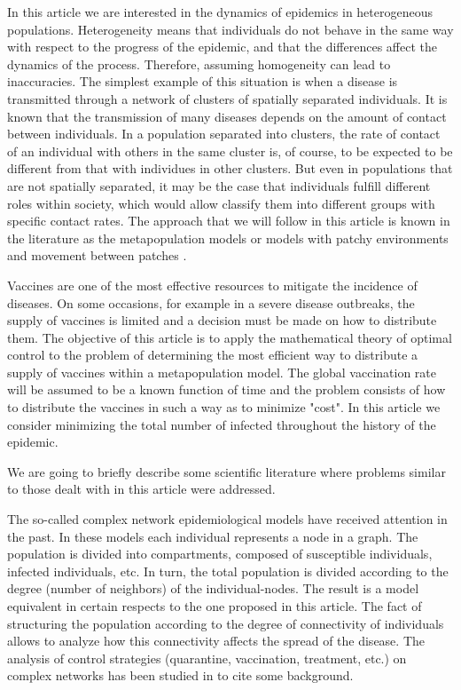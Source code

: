 \documentclass[a4paper,10pt]{article}
\theoremstyle{remark}
\begin{document}
In this article we are interested in the dynamics of epidemics in heterogeneous populations. Heterogeneity means that individuals do not behave in the same way with respect to the progress of the epidemic, and that the differences affect the dynamics of the process. Therefore, assuming  homogeneity can lead to inaccuracies. The simplest example of this situation is when a disease is transmitted through a network of clusters of spatially separated individuals. It is known that the transmission of many diseases depends on the amount of contact between individuals. In a population separated into clusters, the rate of contact of an individual with others in the same cluster is, of course, to be expected to be different from that with individues  in other clusters. But even in populations that are not spatially separated, it may be the case that individuals fulfill different roles within society, which would allow classify   them into different groups with specific contact rates.
The approach that we will follow in this article is known in the literature as the metapopulation models  or models with
patchy environments and movement between patches \cite{FredBrauer482}.

Vaccines are one of the most effective resources to mitigate the incidence of diseases. On some occasions, for example in a severe
disease outbreaks,  the supply of vaccines is limited and a decision must be made on how to distribute them.  The objective of this article is to apply the mathematical theory of optimal control to the problem of determining the most efficient way to distribute a supply of vaccines within a metapopulation model. The global vaccination rate will be assumed to be a known function of time and the problem consists of how to distribute the vaccines in such a way as to minimize "cost". In this article we consider minimizing the total number of infected throughout the history of the epidemic.



We are going to briefly describe some scientific literature where problems similar to those dealt with in this article were addressed.

 
The so-called complex network epidemiological models \cite{Pastor-Satorras2001,Pastor-Satorras2001b}  have received attention in the past. In these models each individual represents a node in a graph. The population is divided into compartments, composed of susceptible individuals, infected individuals, etc. In turn, the total population is divided according to the degree (number of neighbors) of the individual-nodes. The result is a model equivalent in certain respects to the one proposed in this article. The fact of structuring the population according to the degree of connectivity of individuals allows  to analyze how this connectivity affects the spread of the disease. The analysis of control strategies (quarantine, vaccination, treatment, etc.) on complex networks has been studied in \cite{KANG20173945, Esquivel-Gomez2018,Strona2018,Pastor-Satorras2002,Kalisky2004, Nowzari2016} to cite some background. 
\end{document}
